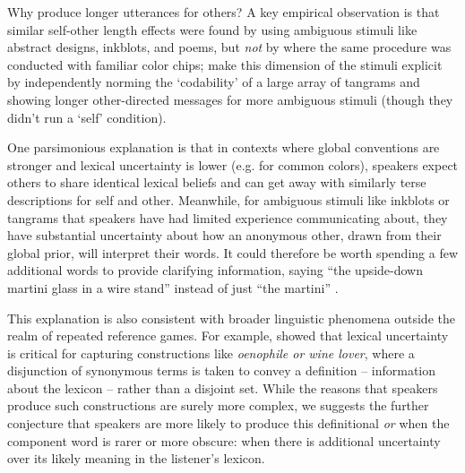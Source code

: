 Why produce longer utterances for others? A key empirical observation is that similar self-other length effects were found by  using ambiguous stimuli like abstract designs, inkblots, and poems, but \emph{not} by  where the same procedure was conducted with familiar color chips;  make this dimension of the stimuli explicit by independently norming the `codability' of a large array of tangrams and showing longer other-directed messages for more ambiguous stimuli (though they didn't run a `self' condition).

One parsimonious explanation is that in contexts where global conventions are stronger and lexical uncertainty is lower (e.g. for common colors), speakers expect others to share identical lexical beliefs and can get away with similarly terse descriptions for self and other. Meanwhile, for ambiguous stimuli like inkblots or tangrams that speakers have had limited experience communicating about, they have substantial uncertainty about how an anonymous other, drawn from their global prior, will interpret their words. %
It could therefore be worth spending a few additional words to provide clarifying information, saying ``the upside-down martini glass in a wire stand'' instead of just ``the martini'' \cite{HawkinsFrankGoodman17_ConventionFormation}.  %


This explanation is also consistent with broader linguistic phenomena outside the realm of repeated reference games. For example,  showed that lexical uncertainty is critical for capturing constructions like \emph{oenophile or wine lover}, where a disjunction of synonymous terms is taken to convey a definition -- information about the lexicon -- rather than a disjoint set. While the reasons that speakers produce such constructions are surely more complex, we suggests the further conjecture that speakers are more likely to produce this definitional \emph{or} when the component word is rarer or more obscure: when there is additional uncertainty over its likely meaning in the listener's lexicon. 

